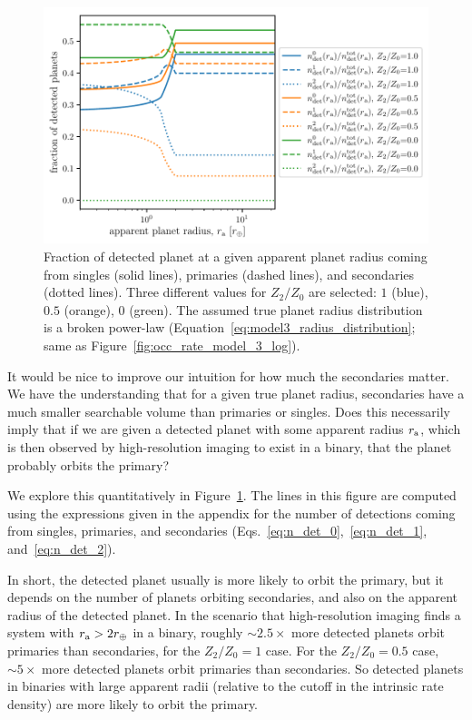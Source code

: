 \documentclass[12pt,modern]{aastex61}
\renewcommand{\a}{_{\rm a}}
\begin{document}
\begin{figure}[!t]
    \centering
    \includegraphics[width=\textwidth]{figures/ndet_vs_radius_logx_model_3_fraclines_rpu_22.5_manyZs.pdf}
    \caption{
        Fraction of detected planet at a given apparent planet radius coming 
        from singles (solid lines), primaries (dashed lines), and secondaries 
        (dotted lines).
        Three different values for $Z_2/Z_0$ are selected: $1$ (blue), $0.5$ 
        (orange), $0$ (green).
        The assumed true planet radius distribution is a broken power-law
        (Equation~\ref{eq:model3_radius_distribution}; same as 
        Figure~\ref{fig:occ_rate_model_3_log}).
    }
    \label{fig:frac_model_3}
\end{figure}

It would be nice to improve our intuition for how much the secondaries matter.
We have the understanding that for a given true planet radius, secondaries 
have a much smaller searchable volume than primaries or singles.
Does this necessarily imply that if we are given a detected planet with some 
apparent radius $r\a$, which is then observed by high-resolution imaging to 
exist in a binary, that the planet probably orbits the primary?

We explore this quantitatively in Figure~\ref{fig:frac_model_3}.
The lines in this figure are computed using the expressions given in the 
appendix for the number of detections coming from singles, primaries, and 
secondaries (Eqs.~\ref{eq:n_det_0},~\ref{eq:n_det_1}, and~\ref{eq:n_det_2}).

In short, the detected planet usually is more likely to orbit the primary, but 
it depends on the number of planets orbiting secondaries, and also on the 
apparent radius of the detected planet.
In the scenario that high-resolution imaging finds a system with $r\a > 
2r_\oplus$ in a binary, roughly $\sim\! 2.5\times$ more detected planets orbit 
primaries than secondaries, for the $Z_2/Z_0=1$ case.
For the $Z_2/Z_0=0.5$ case, $\sim\! 5\times$ more detected 
planets orbit primaries than secondaries.
So detected planets in binaries with large apparent radii (relative to the 
cutoff in the intrinsic rate density) are more likely to orbit the primary.
\end{document}
